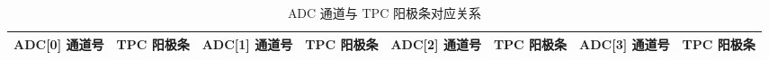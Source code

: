 \begin{table}[!htbp]
  \centering
  \caption{ADC 通道与 TPC 阳极条对应关系}
  \label{tab:feb_map_tpc}
  \begin{tabular}{p{}p{}p{}p{}p{}p{}p{}p{}}
  \toprule
  ADC[0] 通道号 & TPC 阳极条 & ADC[1] 通道号 & TPC 阳极条 & ADC[2] 通道号 & TPC 阳极条 & ADC[3] 通道号 & TPC 阳极条 \\
 \midrule

\end{tabular}
\end{table}
